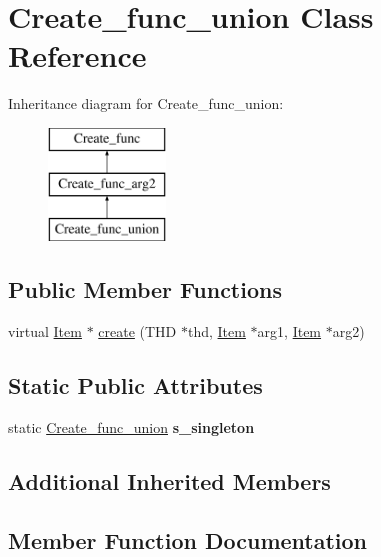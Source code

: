 \hypertarget{classCreate__func__union}{}\section{Create\+\_\+func\+\_\+union Class Reference}
\label{classCreate__func__union}
Inheritance diagram for Create\+\_\+func\+\_\+union\+:\begin{figure}[H]
\begin{center}
\leavevmode
\includegraphics[height=3.000000cm]{classCreate__func__union}
\end{center}
\end{figure}
\subsection*{Public Member Functions}
\begin{DoxyCompactItemize}
\item 
virtual \mbox{\hyperlink{classItem}{Item}} $\ast$ \mbox{\hyperlink{classCreate__func__union_a1c41f4597e7f81d2b96a7879c933d7a6}{create}} (T\+HD $\ast$thd, \mbox{\hyperlink{classItem}{Item}} $\ast$arg1, \mbox{\hyperlink{classItem}{Item}} $\ast$arg2)
\end{DoxyCompactItemize}
\subsection*{Static Public Attributes}
\begin{DoxyCompactItemize}
\item 
\mbox{\label{classCreate__func__union_a8993c2cbcd498a701c3c7590de18e516}} 
static \mbox{\hyperlink{classCreate__func__union}{Create\+\_\+func\+\_\+union}} {\bfseries s\+\_\+singleton}
\end{DoxyCompactItemize}
\subsection*{Additional Inherited Members}


\subsection{Member Function Documentation}
\mbox{\label{classCreate__func__union_a1c41f4597e7f81d2b96a7879c933d7a6}} 
